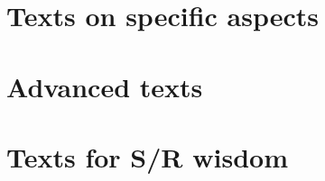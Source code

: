 \documentclass[krantz2]{krantz}\usepackage{knitr}%
\begin{document}
\cite{Allerhand2011,Dalgaard2008,Zuur2009,Teetor2011,Peng2017,Paradis2005,Peng2016}

\section{Texts on specific aspects}

\cite{Chang2013,Fox2002,Fox2010,Faraway2004,Faraway2006,Everitt2011,Wickham2017}

\section{Advanced texts}

\cite{Xie2013,Chambers2016,Wickham2015,Wickham2014advanced,Wickham2016,Pinheiro2000,Murrell2011,Matloff2011,Ihaka1996,Venables2000}

\section{Texts for S/R wisdom}

\cite{Burns1998,Burns2011,Burns2012,Bentley1986,Bentley1988}

\backmatter

\printbibliography

\printindex

\printindex[rcatsidx]

\printindex[rindex]
\end{document}
